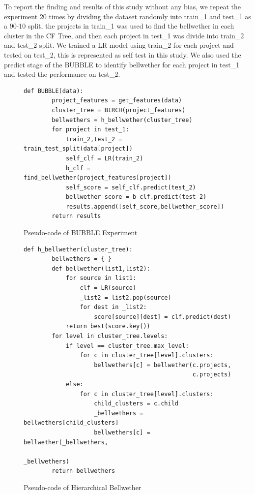 \documentclass[sigconf,review]{acmart}
\theoremstyle{break}
\begin{document}
To report the finding and results of this study without any bias, we repeat the experiment 20 times by dividing the dataset randomly into train\_1 and test\_1 as a 90-10 split, the projects in train\_1 was used to find the bellwether in each cluster in the CF Tree, and then each project in test\_1 was divide into train\_2 and test\_2 split. We trained a LR model using train\_2 for each project and tested on test\_2, this is represented as self test in this study. We also used the predict stage of the BUBBLE to identify bellwether for each project in test\_1 and tested the performance on test\_2. 


\small{
\begin{figure}[]
    \small
     \begin{lstlisting}[mathescape,linewidth=7.5cm,frame=none,numbers=right]
      def BUBBLE(data):
        project_features = get_features(data)
        cluster_tree = BIRCH(project_features)
        bellwethers = h_bellwether(cluster_tree)
        for project in test_1:
            train_2,test_2 = train_test_split(data[project])
            self_clf = LR(train_2)
            b_clf = find_bellwether(project_features[project])
            self_score = self_clf.predict(test_2)
            bellwether_score = b_clf.predict(test_2)
            results.append([self_score,bellwether_score]) 
        return results
    \end{lstlisting} 
    \vspace{-0.2cm}
    \caption{Pseudo-code of BUBBLE Experiment}
    \label{fig:GAP_pseudocode} 
    \vspace{-0.3cm}
\end{figure}
}

\small{
\begin{figure}[]
    \small
     \begin{lstlisting}[mathescape,linewidth=7.5cm,frame=none,numbers=right]
      def h_bellwether(cluster_tree):
        bellwethers = { }
        def bellwether(list1,list2):
            for source in list1:
                clf = LR(source)
                _list2 = list2.pop(source)
                for dest in _list2:
                    score[source][dest] = clf.predict(dest)
            return best(score.key())
        for level in cluster_tree.levels:
            if level == cluster_tree.max_level:
                for c in cluster_tree[level].clusters:
                    bellwethers[c] = bellwether(c.projects,
                                                c.projects)
            else:
                for c in cluster_tree[level].clusters:
                    child_clusters = c.child
                    _bellwethers = bellwethers[child_clusters]
                    bellwethers[c] = bellwether(_bellwethers,
                                                _bellwethers)
        return bellwethers
    \end{lstlisting} 
    \vspace{-0.2cm}
    \caption{Pseudo-code of Hierarchical Bellwether}
    \label{fig:GAP_pseudocode} 
    \vspace{-0.3cm}
\end{figure}
}
\end{document}
